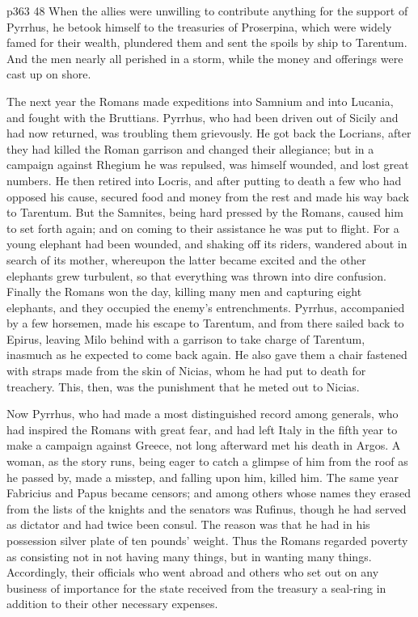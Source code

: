 p363
48
When the allies were unwilling to contribute anything for the support of Pyrrhus, he betook himself to the treasuries of Proserpina, which were widely famed for their wealth, plundered them and sent the spoils by ship to Tarentum. And the men nearly all perished in a storm, while the money and offerings were cast up on shore.

The next year the Romans made expeditions into Samnium and into Lucania, and fought with the Bruttians. Pyrrhus, who had been driven out of Sicily and had now returned, was troubling them grievously. He got back the Locrians, after they had killed the Roman garrison and changed their allegiance; but in a campaign against Rhegium he was repulsed, was himself wounded, and lost great numbers. He then retired into Locris, and after putting to death a few who had opposed his cause, secured food and money from the rest and made his way back to Tarentum. But the Samnites, being hard pressed by the Romans, caused him to set forth again; and on coming to their assistance he was put to flight. For a young elephant had been wounded, and shaking off its riders, wandered about in search of its mother, whereupon the latter became excited and the other elephants grew turbulent, so that everything was thrown into dire confusion. Finally the Romans won the day, killing many men and capturing eight elephants, and they occupied the enemy's entrenchments. Pyrrhus, accompanied by a few horsemen, made his escape to Tarentum, and from there sailed back to Epirus, leaving Milo behind with a garrison to take charge of Tarentum, inasmuch as he expected to come back again. He also gave them a chair fastened with straps made from the skin of Nicias, whom he had put to death for treachery. This, then, was the punishment that he meted out to Nicias.

Now Pyrrhus, who had made a most distinguished record among generals, who had inspired the Romans with great fear, and had left Italy in the fifth year to make a campaign against Greece, not long afterward met his death in Argos. A woman, as the story runs, being eager to catch a glimpse of him from the roof as he passed by, made a misstep, and falling upon him, killed him. The same year Fabricius and Papus became censors; and among others whose names they erased from the lists of the knights and the senators was Rufinus, though he had served as dictator and had twice been consul. The reason was that he had in his possession silver plate of ten pounds' weight. Thus the Romans regarded poverty as consisting not in not having many things, but in wanting many things. Accordingly, their officials who went abroad and others who set out on any business of importance for the state received from the treasury a seal-ring in addition to their other necessary expenses.

